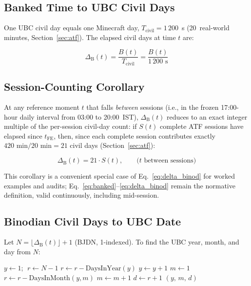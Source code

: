 \documentclass[journal,twoside]{IEEEtran}
\begin{document}
\subsection{Banked Time to UBC Civil Days}

One UBC civil day equals one Minecraft day, $T_{\mathrm{civil}} = 1\,200$~s
(20~real-world minutes, Section~\ref{sec:atf}). The elapsed civil days at time $t$ are:

\begin{equation}
\Delta_{\mathrm{B}}(t) = \frac{B(t)}{T_{\mathrm{civil}}} = \frac{B(t)}{1\,200\text{ s}}
\label{eq:delta_binod}
\end{equation}

\subsection{Session-Counting Corollary}
\label{sec:session_corollary}

At any reference moment $t$ that falls \emph{between} sessions (i.e., in the frozen
17:00-hour daily interval from 03:00 to 20:00~IST), $\Delta_{\mathrm{B}}(t)$ reduces to an
exact integer multiple of the per-session civil-day count: if $S(t)$ complete ATF sessions
have elapsed since $t_{\mathrm{FE}}$, then, since each complete session contributes exactly
$420\text{ min} / 20\text{ min} = 21$ civil days (Section~\ref{sec:atf}):

\begin{equation}
\Delta_{\mathrm{B}}(t) = 21 \cdot S(t), \qquad \text{($t$ between sessions)}
\label{eq:session_corollary}
\end{equation}

\noindent This corollary is a convenient special case of Eq.~\eqref{eq:delta_binod} for
worked examples and audits; Eq.~\eqref{eq:banked}--\eqref{eq:delta_binod} remain the
normative definition, valid continuously, including mid-session.

\subsection{Binodian Civil Days to UBC Date}

Let $N = \lfloor \Delta_{\mathrm{B}}(t) \rfloor + 1$ (BJDN, 1-indexed).  To find the
UBC year, month, and day from $N$:

\begin{algorithm}[!t]
\caption{BJDN to UBC Date}
\label{alg:bjdn2ubc}
\begin{algorithmic}[1]
\STATE $y \leftarrow 1$; $\;r \leftarrow N - 1$
  \STATE $r \leftarrow r - \mathrm{DaysInYear}(y)$
  \STATE $y \leftarrow y + 1$
\ENDWHILE
\STATE $m \leftarrow 1$
  \STATE $r \leftarrow r - \mathrm{DaysInMonth}(y,m)$
  \STATE $m \leftarrow m + 1$
\ENDWHILE
\STATE $d \leftarrow r + 1$
\RETURN $(y,\,m,\,d)$
\end{algorithmic}
\end{algorithm}
\end{document}
